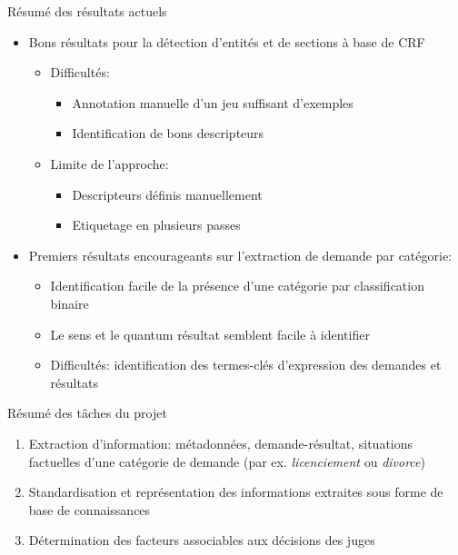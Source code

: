 \documentclass[newPxFont,pagenumber]{beamer}
\begin{document}
\begin{frame}{Résumé des résultats actuels}
\begin{itemize}
\item Bons résultats pour la détection d'entités et de sections à base de CRF
\begin{itemize}
\item Difficultés:
\begin{itemize}
\item Annotation manuelle d'un jeu suffisant d'exemples
\item Identification de bons descripteurs 
\end{itemize}
\item Limite de l'approche:
\begin{itemize}
\item Descripteurs définis manuellement 
\item Etiquetage en plusieurs passes 
\end{itemize}
\end{itemize}
\item Premiers résultats encourageants sur l'extraction de demande par catégorie:
\begin{itemize}
\item Identification facile de la présence d'une catégorie par classification binaire
\item Le sens et le quantum résultat semblent facile à identifier 
\item Difficultés: identification des termes-clés d'expression des demandes et résultats
\end{itemize}
\end{itemize}

\end{frame}

\begin{frame}{Résumé des t\^aches du projet}

\begin{enumerate}
\setlength\itemsep{1.5em}
\item Extraction d'information: métadonnées, demande-résultat, situations factuelles d'une catégorie de demande (par ex. \textit{licenciement} ou \textit{divorce})
\item Standardisation et représentation des informations extraites sous forme de base de connaissances
\item Détermination des facteurs associables aux décisions des juges 
\end{enumerate}

\end{frame}
\end{document}
